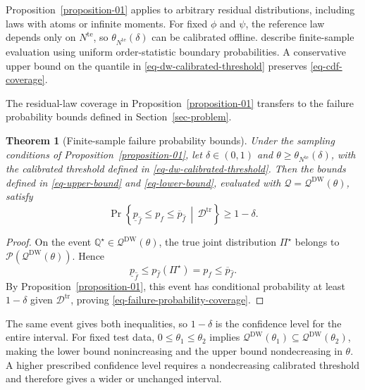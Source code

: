\documentclass[review,11pt,3p,authoryear,nopreprintline]{elsarticle}
\newtheorem{theorem}{Theorem}
\begin{document}
Proposition~\ref{proposition-01} applies to arbitrary residual distributions, including laws with atoms or infinite moments. For fixed $\phi$ and $\psi$, the reference law depends only on $N^{\mathrm{te}}$, so $\theta_{N^{\mathrm{te}}}(\delta)$ can be calibrated offline. \citet{L.J23} describe finite-sample evaluation using uniform order-statistic boundary probabilities. A conservative upper bound on the quantile in \eqref{eq-dw-calibrated-threshold} preserves \eqref{eq-cdf-coverage}.

The residual-law coverage in Proposition~\ref{proposition-01} transfers to the failure probability bounds defined in Section~\ref{sec-problem}.

\begin{theorem}[Finite-sample failure probability bounds]
  \label{theorem-01}
  Under the sampling conditions of Proposition~\ref{proposition-01}, let $\delta\in(0,1)$ and $\theta\ge\theta_{N^{\mathrm{te}}}(\delta)$, with the calibrated threshold defined in \eqref{eq-dw-calibrated-threshold}. Then the bounds defined in \eqref{eq-upper-bound} and \eqref{eq-lower-bound}, evaluated with $\mathcal Q=\mathcal Q^{\mathrm{DW}}(\theta)$, satisfy
  \begin{equation}
    \Pr\left\{\underline p_{\hat f}\le p_f\le\overline p_{\hat f}\,\middle|\,\mathcal D^{\mathrm{tr}}\right\}\ge1-\delta.
    \label{eq-failure-probability-coverage}
  \end{equation}
\end{theorem}

\begin{proof}
  On the event $\mathbb Q^\star\in\mathcal Q^{\mathrm{DW}}(\theta)$, the true joint distribution $\Pi^\star$ belongs to $\mathcal P\left(\mathcal Q^{\mathrm{DW}}(\theta)\right)$. Hence
  \[
    \underline p_{\hat f}\le p_{\hat f}(\Pi^\star)=p_f\le\overline p_{\hat f}.
  \]
  By Proposition~\ref{proposition-01}, this event has conditional probability at least $1-\delta$ given $\mathcal D^{\mathrm{tr}}$, proving \eqref{eq-failure-probability-coverage}.
\end{proof}


The same event gives both inequalities, so $1-\delta$ is the confidence level for the entire interval. For fixed test data, $0\le\theta_1\le\theta_2$ implies $\mathcal Q^{\mathrm{DW}}(\theta_1)\subseteq\mathcal Q^{\mathrm{DW}}(\theta_2)$, making the lower bound nonincreasing and the upper bound nondecreasing in $\theta$. A higher prescribed confidence level requires a nondecreasing calibrated threshold and therefore gives a wider or unchanged interval.
\end{document}
